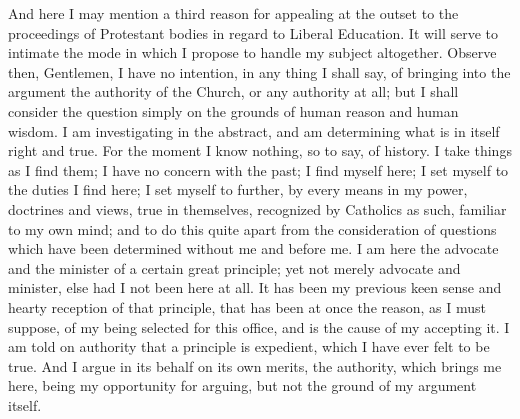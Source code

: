 And here I may mention a third reason for appealing at the outset
to the proceedings of Protestant bodies in regard to Liberal
Education. It will serve to intimate the mode in which I propose to
handle my subject altogether. Observe then, Gentlemen, I have no
intention, in any thing I shall say, of bringing into the argument the
authority of the Church, or any authority at all; but I shall consider
the question simply on the grounds of human reason and human wisdom. I
am investigating in the abstract, and am determining what is in itself
right and true. For the moment I know nothing, so to say, of history.
I take things as I find them; I have no concern with the past; I find
myself here; I set myself to the duties I find here; I set myself to
further, by every means in my power, doctrines and views, true in
themselves, recognized by Catholics as such, familiar to my own
mind; and to do this quite apart from the consideration of questions
which have been determined without me and before me. I am here the
advocate and the minister of a certain great principle; yet not merely
advocate and minister, else had I not been here at all. It has been my
previous keen sense and hearty reception of that principle, that has
been at once the reason, as I must suppose, of my being selected for
this office, and is the cause of my accepting it. I am told on
authority that a principle is expedient, which I have ever felt to be
true. And I argue in its behalf on its own merits, the authority,
which brings me here, being my opportunity for arguing, but not the
ground of my argument itself.

